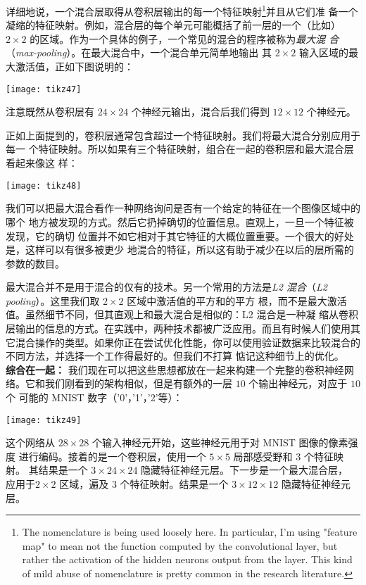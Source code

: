 详细地说，一个混合层取得从卷积层输出的每一个特征映射\footnote{The
  nomenclature is being used loosely here. In particular, I'm using "feature
  map" to mean not the function computed by the convolutional layer, but rather
  the activation of the hidden neurons output from the layer. This kind of mild
  abuse of nomenclature is pretty common in the research literature.}并且从它们准
备一个凝缩的特征映射。例如，混合层的每个单元可能概括了前一层的一个（比如）$2
\times 2$ 的区域。作为一个具体的例子，一个常见的混合的程序被称为\emph{最大混
  合}（\textit{max-pooling}）。在最大混合中，一个混合单元简单地输出
其 $2 \times 2$ 输入区域的最大激活值，正如下图说明的：
\begin{center}
  \texttt{[image: tikz47]}
\end{center}
注意既然从卷积层有 $24 \times 24$ 个神经元输出，混合后我们得到 $12 \times
12$ 个神经元。

正如上面提到的，卷积层通常包含超过一个特征映射。我们将最大混合分别应用于每一
个特征映射。所以如果有三个特征映射，组合在一起的卷积层和最大混合层看起来像这
样：
\begin{center}
  \texttt{[image: tikz48]}  
\end{center}

我们可以把最大混合看作一种网络询问是否有一个给定的特征在一个图像区域中的哪个
地方被发现的方式。然后它扔掉确切的位置信息。直观上，一旦一个特征被发现，它的确切
位置并不如它相对于其它特征的大概位置重要。一个很大的好处是，这样可以有很多被更少
地混合的特征，所以这有助于减少在以后的层所需的参数的数目。

最大混合并不是用于混合的仅有的技术。另一个常用的方法是\emph{L2 混合}（\textit{L2 pooling}）。这里我们取 $2 \times 2$ 区域中激活值的平方和的平方
根，而不是最大激活值。虽然细节不同，但其直观上和最大混合是相似的：L2 混合是一种凝
缩从卷积层输出的信息的方式。在实践中，两种技术都被广泛应用。而且有时候人们使用其
它混合操作的类型。如果你正在尝试优化性能，你可以使用验证数据来比较混合的
不同方法，并选择一个工作得最好的。但我们不打算
惦记这种细节上的优化。\\

\textbf{综合在一起：} 我们现在可以把这些思想都放在一起来构建一个完整的卷积神经网
络。它和我们刚看到的架构相似，但是有额外的一层 $10$ 个输出神经元，对应于 $10$ 个
可能的 MNIST 数字（'0'，'1'，'2'等）：
\begin{center}
  \texttt{[image: tikz49]}  
\end{center}

这个网络从 $28 \times 28$ 个输入神经元开始，这些神经元用于对 MNIST 图像的像素强度
进行编码。接着的是一个卷积层，使用一个 $5 \times 5$ 局部感受野和 $3$ 个特征映射。
其结果是一个 $3 \times 24 \times 24$ 隐藏特征神经元层。下一步是一个最大混合层，
应用于$2 \times 2$ 区域，遍及 $3$ 个特征映射。结果是一个 $3 \times 12 \times 12$
隐藏特征神经元层。

